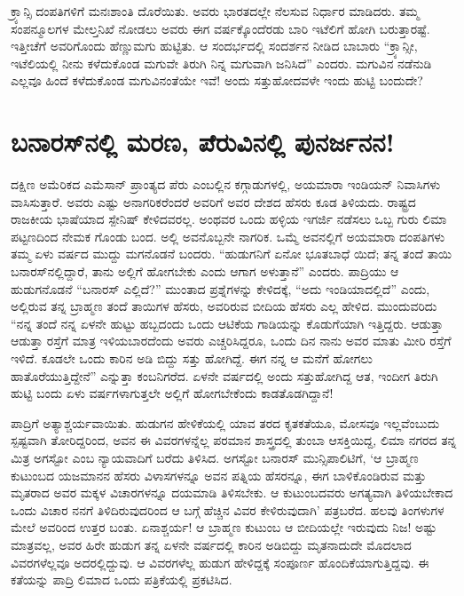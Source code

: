 ಕ್ರ್ಯಾನ್ಸಿ ದಂಪತಿಗಳಿಗೆ ಮನಃಶಾಂತಿ ದೊರೆಯಿತು. ಅವರು ಭಾರತದಲ್ಲೇ ನೆಲಸುವ ನಿರ್ಧಾರ ಮಾಡಿದರು. ತಮ್ಮ ಸಂಪನ್ಮೂಲಗಳ ಮೇಲ್ತನಿಖೆ ನೋಡಲು ಅವರು ಈಗ ವರ್ಷಕ್ಕೊಂದೆರಡು ಬಾರಿ ಇಟೆಲಿಗೆ ಹೋಗಿ ಬರುತ್ತಾರಷ್ಟೆ. ಇತ್ತೀಚೆಗೆ ಅವರಿಗೊಂದು ಹೆಣ್ಣುಮಗು ಹುಟ್ಟಿತು. ಆ ಸಂದರ್ಭದಲ್ಲಿ ಸಂದರ್ಶನ ನೀಡಿದ ಬಾಬಾರು “ಕ್ರ್ಯಾನ್ಸೀ, ಇಟೆಲಿಯಲ್ಲಿ ನೀನು ಕಳೆದುಕೊಂಡ ಮಗುವೇ ತಿರುಗಿ ನಿನ್ನ ಮಗುವಾಗಿ ಜನಿಸಿದೆ” ಎಂದರು. ಮಗುವಿನ ನಡೆನುಡಿ ಎಲ್ಲವೂ ಹಿಂದೆ ಕಳೆದುಕೊಂಡ ಮಗುವಿನಂತೆಯೇ ಇವೆ! ಅಂದು ಸತ್ತುಹೋದವಳೇ ಇಂದು ಹುಟ್ಟಿ ಬಂದುದೇ?


\section{ಬನಾರಸ್​ನಲ್ಲಿ ಮರಣ, ಪೆರುವಿನಲ್ಲಿ ಪುನರ್ಜನನ!}

ದಕ್ಷಿಣ ಅಮೆರಿಕದ ಎಮೆಸಾನ್ ಪ್ರಾಂತ್ಯದ ಪೆರು ಎಂಬಲ್ಲಿನ ಕಗ್ಗಾಡುಗಳಲ್ಲಿ, ಅಯಮಾರಾ ಇಂಡಿಯನ್ ನಿವಾಸಿಗಳು ವಾಸಿಸುತ್ತಾರೆ. ಅವರು ಎಷ್ಟು ಅನಾಗರಿಕರೆಂದರೆ ಅವರಿಗೆ ಅವರ ದೇಶದ ಹೆಸರು ಕೂಡ ತಿಳಿಯದು. ರಾಷ್ಟ್ರದ ರಾಜಕೀಯ ಭಾಷೆಯಾದ ಸ್ಪೇನಿಷ್ ಕೇಳಿದವರಲ್ಲ. ಅಂಥವರ ಒಂದು ಹಳ್ಳಿಯ ಇಗರ್ಜಿ ನಡೆಸಲು ಒಬ್ಬ ಗುರು ಲಿಮಾ ಪಟ್ಟಣದಿಂದ ನೇಮಕ ಗೊಂಡು ಬಂದ. ಅಲ್ಲಿ ಅವನೊಬ್ಬನೇ ನಾಗರಿಕ. ಒಮ್ಮೆ ಅವನಲ್ಲಿಗೆ ಅಯಮಾರಾ ದಂಪತಿಗಳು ತಮ್ಮ ಏಳು ವರ್ಷದ ಮುದ್ದು ಮಗನೊಡನೆ ಬಂದರು. “ಹುಡುಗನಿಗೆ ಏನೋ ಭೂತಬಾಧೆ ಯಿದೆ; ತನ್ನ ತಂದೆ ತಾಯಿ ಬನಾರಸ್​ನಲ್ಲಿದ್ದಾರೆ, ತಾನು ಅಲ್ಲಿಗೆ ಹೋಗಬೇಕು ಎಂದು ಆಗಾಗ ಅಳುತ್ತಾನೆ” ಎಂದರು. ಪಾದ್ರಿಯು ಆ ಹುಡುಗನೊಡನೆ “ಬನಾರಸ್ ಎಲ್ಲಿದೆ?” ಮುಂತಾದ ಪ್ರಶ್ನೆಗಳನ್ನು ಕೇಳಿದಕ್ಕೆ, “ಅದು ಇಂಡಿಯಾದಲ್ಲಿದೆ” ಎಂದು, ಅಲ್ಲಿರುವ ತನ್ನ ಬ್ರಾಹ್ಮಣ ತಂದೆ ತಾಯಿಗಳ ಹೆಸರು, ಅವರಿರುವ ಬೀದಿಯ ಹೆಸರು ಎಲ್ಲ ಹೇಳಿದ. ಮುಂದುವರಿದು “ನನ್ನ ತಂದೆ ನನ್ನ ಏಳನೇ ಹುಟ್ಟು ಹಬ್ಬದಂದು ಒಂದು ಆಟಿಕೆಯ ಗಾಡಿಯನ್ನು ಕೊಡುಗೆಯಾಗಿ ಇತ್ತಿದ್ದರು. ಆಡುತ್ತಾ ಆಡುತ್ತಾ ರಸ್ತೆಗೆ ಮಾತ್ರ ಇಳಿಯಬಾರದೆಂದು ಅವರು ಎಚ್ಚರಿಸಿದ್ದರೂ, ಒಂದು ದಿನ ನಾನು ಅವರ ಮಾತು ಮೀರಿ ರಸ್ತೆಗೆ ಇಳಿದೆ. ಕೂಡಲೇ ಒಂದು ಕಾರಿನ ಅಡಿ ಬಿದ್ದು ಸತ್ತು ಹೋಗಿದ್ದೆ. ಈಗ ನನ್ನ ಆ ಮನೆಗೆ ಹೋಗಲು ಹಾತೊರೆಯುತ್ತಿದ್ದೇನೆ” ಎನ್ನುತ್ತಾ ಕಂಬನಿಗರೆದ. ಏಳನೇ ವರ್ಷದಲ್ಲಿ ಅಂದು ಸತ್ತುಹೋಗಿದ್ದ ಆತ, ಇಂದೀಗ ತಿರುಗಿ ಹುಟ್ಟಿ ಬಂದು ಏಳು ವರ್ಷಗಳಾಗುತ್ತಲೇ ಅಲ್ಲಿಗೆ ಹೋಗಬೇಕೆಂದು ಕಾಡತೊಡಗಿದ್ದಾನೆ!

ಪಾದ್ರಿಗೆ ಅತ್ಯಾಶ್ಚರ್ಯವಾಯಿತು. ಹುಡುಗನ ಹೇಳಿಕೆಯಲ್ಲಿ ಯಾವ ತರದ ಕೃತಕತೆಯೂ, ಮೋಸವೂ ಇಲ್ಲವೆಂಬುದು ಸ್ಪಷ್ಟವಾಗಿ ತೋರಿದ್ದರಿಂದ, ಅವನ ಈ ವಿವರಗಳನ್ನೆಲ್ಲ ಪರಮಾನ ಶಾಸ್ತ್ರದಲ್ಲಿ ತುಂಬಾ ಆಸಕ್ತಿಯಿದ್ದ, ಲಿಮಾ ನಗರದ ತನ್ನ ಮಿತ್ರ ಅಗಸ್ಟೋ ಎಂಬ ನ್ಯಾಯವಾದಿಗೆ ಬರೆದು ತಿಳಿಸಿದ. ಅಗಸ್ಟೋ ಬನಾರಸ್ ಮುನ್ಸಿಪಾಲಿಟಿಗೆ, ‘ಆ ಬ್ರಾಹ್ಮಣ ಕುಟುಂಬದ ಯಜಮಾನನ ಹೆಸರು ವಿಳಾಸಗಳನ್ನೂ ಅವನ ಪತ್ನಿಯ ಹೆಸರನ್ನೂ, ಈಗ ಬಾಳಿಕೊಂಡಿರುವ ಮತ್ತು ಮೃತರಾದ ಅವರ ಮಕ್ಕಳ ವಿಚಾರಗಳನ್ನೂ ದಯಮಾಡಿ ತಿಳಿಸಬೇಕು. ಆ ಕುಟುಂಬದವರು ಅಗತ್ಯವಾಗಿ ತಿಳಿಯಬೇಕಾದ ಒಂದು ವಿಚಾರ ನನಗೆ ತಿಳಿದಿರುವುದರಿಂದ ಆ ಬಗ್ಗೆ ಹೆಚ್ಚಿನ ವಿವರ ಕೇಳಿರುವುದಾಗಿ’ ಪತ್ರಬರೆದ. ಹಲವು ತಿಂಗಳುಗಳ ಮೇಲೆ ಅವರಿಂದ ಉತ್ತರ ಬಂತು. ಏನಾಶ್ಚರ್ಯ! ಆ ಬ್ರಾಹ್ಮಣ ಕುಟುಂಬ ಆ ಬೀದಿಯಲ್ಲೇ ಇರುವುದು ನಿಜ! ಅಷ್ಟು ಮಾತ್ರವಲ್ಲ, ಅವರ ಹಿರೇ ಹುಡುಗ ತನ್ನ ಏಳನೇ ವರ್ಷದಲ್ಲಿ ಕಾರಿನ ಅಡಿಬಿದ್ದು ಮೃತನಾದುದೇ ಮೊದಲಾದ ವಿವರಗಳೆಲ್ಲವೂ ಅದರಲ್ಲಿದ್ದುವು. ಆ ವಿವರಗಳೆಲ್ಲ ಹುಡುಗ ಹೇಳಿದ್ದಕ್ಕೆ ಸಂಪೂರ್ಣ ಹೊಂದಿಕೆಯಾಗುತ್ತಿದ್ದವು. ಈ ಕತೆಯನ್ನು ಪಾದ್ರಿ ಲಿಮಾದ ಒಂದು ಪತ್ರಿಕೆಯಲ್ಲಿ ಪ್ರಕಟಿಸಿದ.

